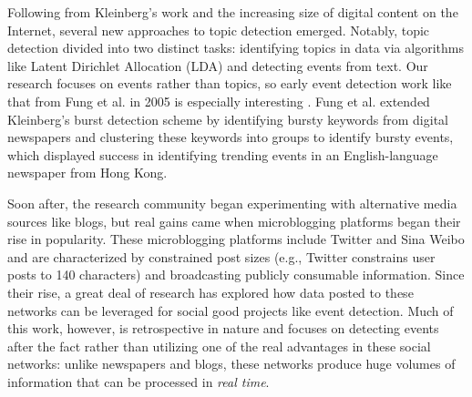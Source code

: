 \documentclass{sig-alternate}
\begin{document}
Following from Kleinberg's work and the increasing size of digital content on the Internet, several new approaches to topic detection emerged.
Notably, topic detection divided into two distinct tasks: identifying topics in data via algorithms like Latent Dirichlet Allocation (LDA) \cite{blei2003latent} and detecting events from text.
Our research focuses on events rather than topics, so early event detection work like that from Fung et al. in 2005 is especially interesting \cite{Fung:2005:PFB:1083592.1083616}.
Fung et al. extended Kleinberg's burst detection scheme by identifying bursty keywords from digital newspapers and clustering these keywords into groups to identify bursty events, which displayed success in identifying trending events in an English-language newspaper from Hong Kong.



Soon after, the research community began experimenting with alternative media sources like blogs, but real gains came when microblogging platforms began their rise in popularity.
These microblogging platforms include Twitter and Sina Weibo and are characterized by constrained post sizes (e.g., Twitter constrains user posts to 140 characters) and broadcasting publicly consumable information.
Since their rise, a great deal of research has explored how data posted to these networks can be leveraged for social good projects like event detection.
Much of this work, however, is retrospective in nature and focuses on detecting events after the fact rather than utilizing one of the real advantages in these social networks: unlike newspapers and blogs, these networks produce huge volumes of information that can be processed in \emph{real time}.
\end{document}
